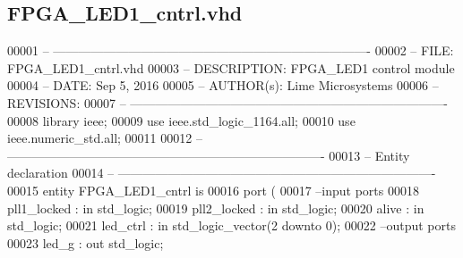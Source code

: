 \subsection{F\+P\+G\+A\+\_\+\+L\+E\+D1\+\_\+cntrl.\+vhd}
\label{FPGA__LED1__cntrl_8vhd_source}

\begin{DoxyCode}
00001 \textcolor{keyword}{-- ---------------------------------------------------------------------------- }
00002 \textcolor{keyword}{-- FILE:    FPGA\_LED1\_cntrl.vhd}
00003 \textcolor{keyword}{-- DESCRIPTION: FPGA\_LED1 control module}
00004 \textcolor{keyword}{-- DATE:    Sep 5, 2016}
00005 \textcolor{keyword}{-- AUTHOR(s):   Lime Microsystems}
00006 \textcolor{keyword}{-- REVISIONS:}
00007 \textcolor{keyword}{-- ---------------------------------------------------------------------------- }
00008 \textcolor{vhdlkeyword}{library }\textcolor{keywordflow}{ieee};
00009 \textcolor{vhdlkeyword}{use }ieee.std\_logic\_1164.\textcolor{keywordflow}{all};
00010 \textcolor{vhdlkeyword}{use }ieee.numeric\_std.\textcolor{keywordflow}{all};
00011 
00012 \textcolor{keyword}{-- ----------------------------------------------------------------------------}
00013 \textcolor{keyword}{-- Entity declaration}
00014 \textcolor{keyword}{-- ----------------------------------------------------------------------------}
00015 \textcolor{keywordflow}{entity }FPGA_LED1_cntrl \textcolor{keywordflow}{is}
00016   \textcolor{keywordflow}{port} \textcolor{vhdlchar}{(}
00017 \textcolor{keyword}{        --input ports }
00018         \textcolor{vhdlchar}{pll1_locked}   \textcolor{vhdlchar}{:} \textcolor{keywordflow}{in} \textcolor{comment}{std\_logic};
00019         \textcolor{vhdlchar}{pll2_locked}   \textcolor{vhdlchar}{:} \textcolor{keywordflow}{in} \textcolor{comment}{std\_logic};
00020           \textcolor{vhdlchar}{alive}          \textcolor{vhdlchar}{:} \textcolor{keywordflow}{in} \textcolor{comment}{std\_logic};
00021           \textcolor{vhdlchar}{led_ctrl}       \textcolor{vhdlchar}{:} \textcolor{keywordflow}{in} \textcolor{comment}{std\_logic\_vector}\textcolor{vhdlchar}{(}\textcolor{vhdllogic}{}\textcolor{vhdllogic}{2} \textcolor{keywordflow}{downto} \textcolor{vhdllogic}{}\textcolor{vhdllogic}{0}\textcolor{vhdlchar}{)};
00022 \textcolor{keyword}{        --output ports }
00023           \textcolor{vhdlchar}{led_g}          \textcolor{vhdlchar}{:} \textcolor{keywordflow}{out} \textcolor{comment}{std\_logic};

\end{DoxyCode}
